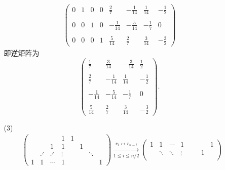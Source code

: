 \documentclass{article}
\begin{document}
\begin{enumerate}
\begin{enumerate}
\begin{align*}
\begin{pmatrix}
                0 & 1 & 0 & 0 &  \displaystyle{\frac{2}{7}}  & \displaystyle{-\frac{1}{14}} &  \displaystyle{\frac{1}{14}} & \displaystyle{-\frac{1}{2}}\\ \\
                0 & 0 & 1 & 0 & \displaystyle{-\frac{1}{14}} & \displaystyle{-\frac{5}{14}} & \displaystyle{-\frac{1}{7}} & 0\\ \\
                0 & 0 & 0 & 1 &  \displaystyle{\frac{5}{14}} &  \displaystyle{\frac{2}{7}} &  \displaystyle{\frac{3}{14}} &  \displaystyle{-\frac{3}{2}}
            \end{pmatrix}
        \end{align*}
        即逆矩阵为
        \[
            \begin{pmatrix}
                \displaystyle{\frac{1}{7}}   &  \displaystyle{\frac{3}{14}} & \displaystyle{-\frac{3}{14}} & \displaystyle{\frac{1}{2}}\\ \\
                \displaystyle{\frac{2}{7}}   & \displaystyle{-\frac{1}{14}} & \displaystyle{\frac{1}{14}} & \displaystyle{-\frac{1}{2}}\\ \\
                \displaystyle{-\frac{1}{14}} & \displaystyle{-\frac{5}{14}} & \displaystyle{-\frac{1}{7}}  & 0\\ \\
                \displaystyle{\frac{5}{14}}  &  \displaystyle{\frac{2}{7}} &  \displaystyle{\frac{3}{14}} &  \displaystyle{-\frac{3}{2}}
            \end{pmatrix}.
        \]
        \item [(3)]
        \begin{align*}
            &\begin{pmatrix}
                  &         &         &      1 & 1 &   &        & \\
                  &         &       1 &      1 &   & 1 &        & \\
                  & \iddots & \iddots & \vdots &   &   & \ddots & \\ 
                1 &      1  &  \cdots &      1 &   &   &        & 1
            \end{pmatrix}
            \xrightarrow[1\leqslant i \leqslant n/2]{r_{i}\leftrightarrow r_{n-i}}
            \begin{pmatrix}
                1 &      1 & \cdots &      1 &   &         &   & 1\\
                  & \ddots & \ddots & \vdots &   &         & 1 &  \\

\end{pmatrix}
\end{align*}
\end{enumerate}
\end{enumerate}
\end{document}
